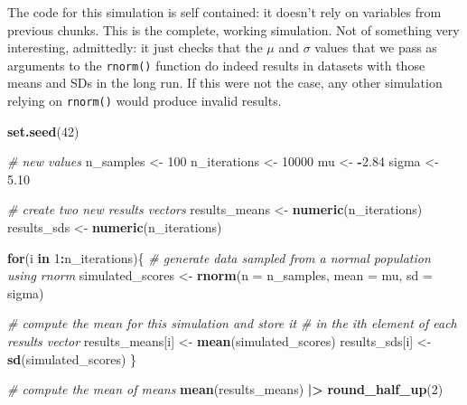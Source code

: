 \documentclass[
]{article}
\newenvironment{Shaded}{\begin{snugshade}}{\end{snugshade}}
\newcommand{\AttributeTok}[1]{\textcolor[rgb]{0.13,0.29,0.53}{#1}}
\newcommand{\CommentTok}[1]{\textcolor[rgb]{0.56,0.35,0.01}{\textit{#1}}}
\newcommand{\ControlFlowTok}[1]{\textcolor[rgb]{0.13,0.29,0.53}{\textbf{#1}}}
\newcommand{\DecValTok}[1]{\textcolor[rgb]{0.00,0.00,0.81}{#1}}
\newcommand{\FloatTok}[1]{\textcolor[rgb]{0.00,0.00,0.81}{#1}}
\newcommand{\FunctionTok}[1]{\textcolor[rgb]{0.13,0.29,0.53}{\textbf{#1}}}
\newcommand{\NormalTok}[1]{#1}
\newcommand{\OtherTok}[1]{\textcolor[rgb]{0.56,0.35,0.01}{#1}}
\newcommand{\SpecialCharTok}[1]{\textcolor[rgb]{0.81,0.36,0.00}{\textbf{#1}}}
\begin{document}
The code for this simulation is self contained: it doesn't rely on
variables from previous chunks. This is the complete, working
simulation. Not of something very interesting, admittedly: it just
checks that the \(\mu\) and \(\sigma\) values that we pass as arguments
to the \texttt{rnorm()} function do indeed results in datasets with
those means and SDs in the long run. If this were not the case, any
other simulation relying on \texttt{rnorm()} would produce invalid
results.

\begin{Shaded}
\begin{Highlighting}[]
\FunctionTok{set.seed}\NormalTok{(}\DecValTok{42}\NormalTok{)}

\CommentTok{\# new values }
\NormalTok{n\_samples }\OtherTok{\textless{}{-}} \DecValTok{100}
\NormalTok{n\_iterations }\OtherTok{\textless{}{-}} \DecValTok{10000}
\NormalTok{mu }\OtherTok{\textless{}{-}} \SpecialCharTok{{-}}\FloatTok{2.84}
\NormalTok{sigma }\OtherTok{\textless{}{-}} \FloatTok{5.10}

\CommentTok{\# create two new results vectors}
\NormalTok{results\_means }\OtherTok{\textless{}{-}} \FunctionTok{numeric}\NormalTok{(n\_iterations)}
\NormalTok{results\_sds }\OtherTok{\textless{}{-}} \FunctionTok{numeric}\NormalTok{(n\_iterations)}

\ControlFlowTok{for}\NormalTok{(i }\ControlFlowTok{in} \DecValTok{1}\SpecialCharTok{:}\NormalTok{n\_iterations)\{}
  \CommentTok{\# generate data sampled from a normal population using rnorm}
\NormalTok{  simulated\_scores }\OtherTok{\textless{}{-}} 
    \FunctionTok{rnorm}\NormalTok{(}\AttributeTok{n =}\NormalTok{ n\_samples, }
          \AttributeTok{mean =}\NormalTok{ mu, }
          \AttributeTok{sd =}\NormalTok{ sigma)}
  
  \CommentTok{\# compute the mean for this simulation and store it }
  \CommentTok{\# in the \textasciigrave{}i\textasciigrave{}th element of each results vector}
\NormalTok{  results\_means[i] }\OtherTok{\textless{}{-}} \FunctionTok{mean}\NormalTok{(simulated\_scores)}
\NormalTok{  results\_sds[i] }\OtherTok{\textless{}{-}} \FunctionTok{sd}\NormalTok{(simulated\_scores)}
\NormalTok{\}}

\CommentTok{\# compute the mean of means}
\FunctionTok{mean}\NormalTok{(results\_means) }\SpecialCharTok{|\textgreater{}} \FunctionTok{round\_half\_up}\NormalTok{(}\DecValTok{2}\NormalTok{)}
\end{Highlighting}
\end{Shaded}
\end{document}
